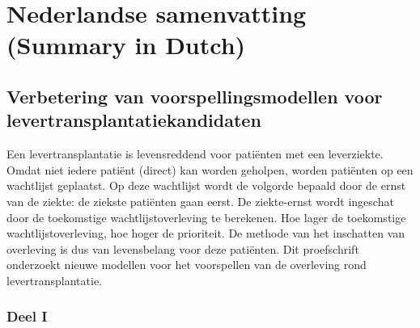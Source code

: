 \documentclass[11pt,english,]{book} %
\begin{document}
\newpage
\linespread{1.213}
\normalsize
\thispagestyle{plain}

\mbox{}

\backmatter
{}
\pagecolor{black}
\color{white}

\hypertarget{chap-nlsum}{%
\chapter{Nederlandse samenvatting (Summary in Dutch)}\label{chap-nlsum}}


\newpage
\nopagecolor
\color{black}

\hypertarget{verbetering-van-voorspellingsmodellen-voor-levertransplantatiekandidaten}{%
\section*{Verbetering van voorspellingsmodellen voor levertransplantatiekandidaten}\label{verbetering-van-voorspellingsmodellen-voor-levertransplantatiekandidaten}}

\bigskip

Een levertransplantatie is levensreddend voor patiënten met een leverziekte. Omdat niet iedere patiënt (direct) kan worden geholpen, worden patiënten op een wachtlijst geplaatst. Op deze wachtlijst wordt de volgorde bepaald door de ernst van de ziekte: de ziekste patiënten gaan eerst. De ziekte-ernst wordt ingeschat door de toekomstige wachtlijstoverleving te berekenen. Hoe lager de toekomstige wachtlijstoverleving, hoe hoger de prioriteit. De methode van het inschatten van overleving is dus van levensbelang voor deze patiënten. Dit proefschrift onderzoekt nieuwe modellen voor het voorspellen van de overleving rond levertransplantatie.

\hypertarget{deel-i}{%
\subsection*{Deel I}\label{deel-i}}
\end{document}
